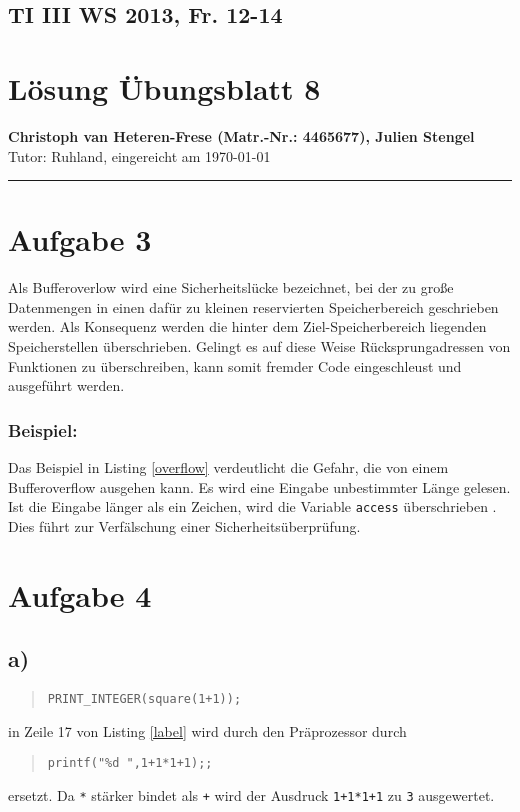 \documentclass[11pt, a4paper]{scrartcl}
\begin{document}
\lstset{basicstyle=\small,
		 inputencoding=latin1,
		stringstyle=\ttfamily,
		identifierstyle=,
		showstringspaces=false,
		language=c,
		frame=trBL,
		numbers=left,
		numberstyle=\footnotesize
		}
%
\subsection*{TI III WS 2013, Fr. 12-14}
\section*{Lösung Übungsblatt 8}
\textbf{Christoph van Heteren-Frese (Matr.-Nr.: 4465677), Julien  Stengel } \\%
Tutor: Ruhland, eingereicht am \today\\
\hrule
%
\section*{Aufgabe 3}
Als Bufferoverlow wird eine Sicherheitslücke bezeichnet, bei der zu große Datenmengen in einen dafür zu kleinen reservierten Speicherbereich geschrieben werden. Als Konsequenz werden die hinter dem Ziel-Speicherbereich liegenden Speicherstellen überschrieben.
Gelingt es auf diese Weise Rücksprungadressen von Funktionen zu überschreiben, kann somit fremder Code eingeschleust und ausgeführt werden.
\subsubsection*{Beispiel:}

Das Beispiel in Listing \ref{overflow} verdeutlicht die Gefahr, die von einem Bufferoverflow ausgehen kann. Es wird eine Eingabe unbestimmter Länge gelesen. Ist die Eingabe länger als ein Zeichen, wird die Variable \texttt{access} überschrieben	. Dies führt zur Verfälschung einer Sicherheitsüberprüfung.
\section*{Aufgabe 4}
\subsection*{a)}
\begin{quote}
\texttt{PRINT\_INTEGER(square(1+1));}
\end{quote}
in Zeile 17 von Listing \ref{label} wird durch den Präprozessor durch 
\begin{quote}
\texttt{printf("\%d ",1+1*1+1);;}
\end{quote}
ersetzt. Da \texttt{*} stärker bindet als \texttt{+} wird der Ausdruck \texttt{1+1*1+1} zu \texttt{3} ausgewertet. 
\end{document}
